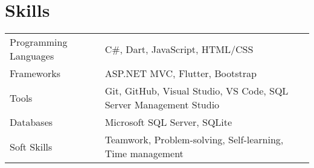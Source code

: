 \documentclass[a4paper,12pt]{article}
\begin{document}
\section{Skills}
\begin{tabularx}{\linewidth}{@{}l X@{}}

Programming Languages & C\#, Dart, JavaScript, HTML/CSS \\


Frameworks & ASP.NET MVC, Flutter, Bootstrap \\


Tools & Git, GitHub, Visual Studio, VS Code, SQL Server Management Studio \\


Databases & Microsoft SQL Server, SQLite \\


Soft Skills & Teamwork, Problem-solving, Self-learning, Time management \\
\end{tabularx}

\vfill
{}
\end{document}
